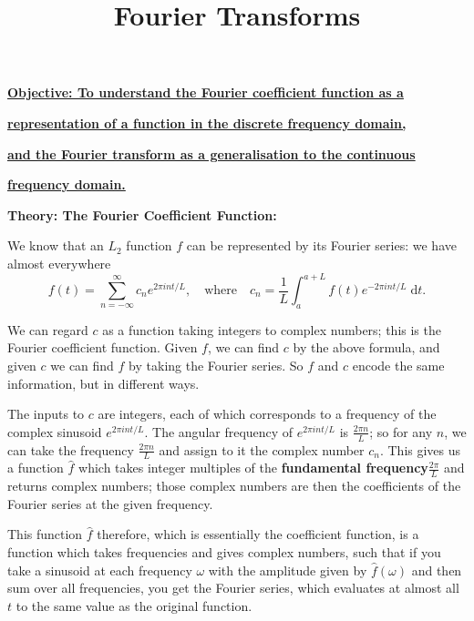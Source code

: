 \documentclass{article}
\newcommand{\diff}{\;\mathrm{d}}
\begin{document}
\title{Fourier Transforms}
\date{}

\maketitle
\thispagestyle{empty}

\Large

\vskip -10mm

\textbf{\underline{Objective: To understand the Fourier coefficient function as a}}

\textbf{\underline{representation of a function in the discrete frequency domain,}}

\textbf{\underline{and the Fourier transform as a generalisation to the continuous}}

\textbf{\underline{frequency domain.}}






\vspace{5mm}












\textbf{Theory: The Fourier Coefficient Function:}

\bigskip


We know that an $L_2$ function $f$ can be represented by its Fourier series: we have almost everywhere
\[f(t)=\sum_{n=-\infty}^\infty c_n e^{2\pi int/L},\quad\mbox{where}\quad c_n=\frac{1}{L}\int_a^{a+L}\!\! f(t)e^{-2\pi int/L}\diff t.\]


We can regard $c$ as a function taking integers to complex numbers; this is the Fourier coefficient function. Given $f$, we can find $c$ by the above formula, and given $c$ we can find $f$ by taking the Fourier series. So $f$ and $c$ encode the same information, but in different ways.

The inputs to $c$ are integers, each of which corresponds to a frequency of the complex sinusoid $e^{2\pi int/L}$. The angular frequency of $e^{2\pi int/L}$ is $\frac{2\pi n}{L}$; so for any $n$, we can take the frequency $\frac{2\pi n}{L}$ and assign to it the complex number $c_n$. This gives us a function $\hat{f}$ which takes integer multiples of the \textbf{fundamental frequency}$\frac{2\pi}{L}$ and returns complex numbers; those complex numbers are then the coefficients of the Fourier series at the given frequency.

This function $\hat{f}$ therefore, which is essentially the coefficient function, is a function which takes frequencies and gives complex numbers, such that if you take a sinusoid at each frequency $\omega$ with the amplitude given by $\hat{f}(\omega)$ and then sum over all frequencies, you get the Fourier series, which evaluates at almost all $t$ to the same value as the original function.
\end{document}
